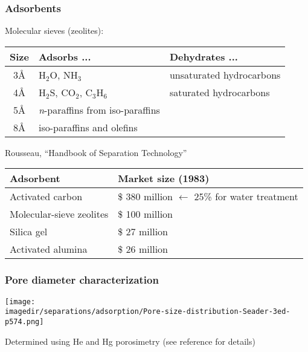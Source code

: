 \begin{frame}\frametitle{Adsorbents}
	Molecular sieves (zeolites):
	
	\begin{tabular}{cll}\\
		\textbf{Size}	&	\textbf{Adsorbs} ... 					&	\textbf{Dehydrates} ...\vspace{6pt}\\ \hline 
		3\AA			&	$\text{H}_2\text{O}$, $\text{NH}_3$		& 	unsaturated hydrocarbons\\
		4\AA			&  	$\text{H}_2\text{S}$, $\text{CO}_2$, $\text{C}_3\text{H}_6$		& 	saturated hydrocarbons\\
		5\AA			&	\emph{n}-paraffins from iso-paraffins   & \\
		8\AA			& 	iso-paraffins and olefins				&	\\
	\end{tabular}
	\vspace{12pt}

	\vspace{12pt}
	Rousseau, ``Handbook of Separation Technology''

	\begin{tabular}{ll}\\
		\textbf{Adsorbent}				&	\textbf{Market size (1983)} \vspace{6pt}\\ \hline 
			Activated carbon 			&	\$ 380 million $\longleftarrow$ 25\% for water treatment \\
			Molecular-sieve zeolites 	&	\$ 100 million  \\
			Silica gel					&	\$ 27 million  \\
			Activated alumina			&	\$ 26 million
	\end{tabular}
\end{frame}

\begin{frame}\frametitle{Pore diameter characterization}
	\begin{center}
		\texttt{[image: \\imagedir/separations/adsorption/Pore-size-distribution-Seader-3ed-p574.png]}
	\end{center}
	{\scriptsize Determined using He and Hg porosimetry (see reference for details)}
\end{frame}

